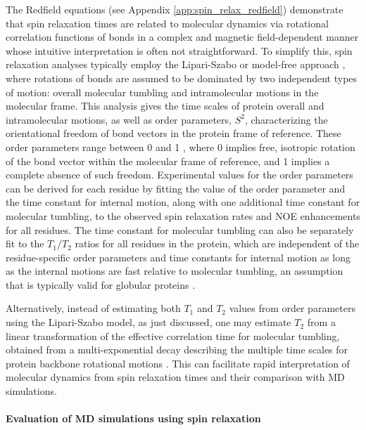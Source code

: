 \documentclass[9pt,review,pubversion]{livecoms}
\begin{document}
The Redfield equations \cite{redfield_theory_1965} (see Appendix \ref{app:spin_relax_redfield}) demonstrate that spin relaxation times are related to molecular dynamics via rotational correlation functions of bonds in a complex and magnetic field-dependent manner whose intuitive interpretation is often not straightforward.
To simplify this,  spin relaxation analyses \cite{best_determination_2004,showalter_toward_2007,showalter_validation_2007,maragakis_microsecond_2008,trbovic_structural_2008} typically employ the Lipari-Szabo or model-free approach \cite{halle1981interpretation,lipari_model-free_1982}, where rotations of bonds are assumed to be dominated by two independent types of motion: overall molecular tumbling and intramolecular motions in the molecular frame.
This analysis gives the time scales of protein overall and intramolecular motions, as well as order parameters, $S^2$, characterizing the orientational freedom of bond vectors in the protein frame of reference.
These order parameters range between 0 and 1 \cite{lipari_model-free_1982}, where 0 implies free, isotropic rotation of the bond vector within the molecular frame of reference, and 1 implies a complete absence of such freedom.
Experimental values for the order parameters can be derived for each residue by fitting the value of the order parameter and the time constant for internal motion, along with one additional time constant for molecular tumbling, to the observed spin relaxation rates and NOE enhancements for all residues.
The time constant for molecular tumbling can also be separately fit to the $T_1/T_2$ ratios for all residues in the protein, which are independent of the residue-specific order parameters and time constants for internal motion as long as the internal motions are fast relative to molecular tumbling, an assumption that is typically valid for globular proteins \cite{virtanen_heterogeneous_2020}.

Alternatively, instead of estimating both $T_1$ and $T_2$ values from order parameters using the Lipari-Szabo model, as just discussed, one may estimate $T_2$ from a linear transformation of the effective correlation time for molecular tumbling, obtained from a multi-exponential decay describing the multiple time scales for protein backbone rotational motions \cite{nencini_rapid_2024}.
This can facilitate rapid interpretation of molecular dynamics from spin relaxation times and their comparison with MD simulations.

\paragraph{Evaluation of MD simulations using spin relaxation}
\end{document}
